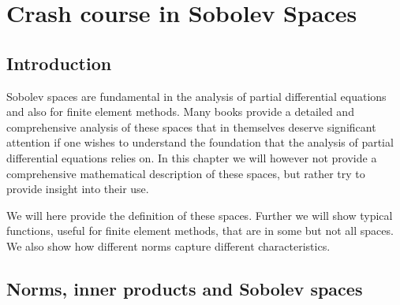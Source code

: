 \chapter{Crash course in Sobolev Spaces}

\label{chap-sobolev}
\section{Introduction}

Sobolev spaces are fundamental in the analysis of partial differential equations and also for 
finite element methods. Many books provide a detailed and comprehensive analysis of these spaces
that in themselves deserve significant attention if one wishes to understand the foundation that
the analysis of partial differential equations relies on. In this chapter we will however not
provide a comprehensive mathematical description of these spaces, but rather try to provide 
insight into their use. 

We will here provide the definition of these spaces. Further we will show typical functions, useful
for finite element methods,  that are in some but not all spaces. We also show how different norms
capture different characteristics.   

\section{Norms, inner products and Sobolev spaces}


